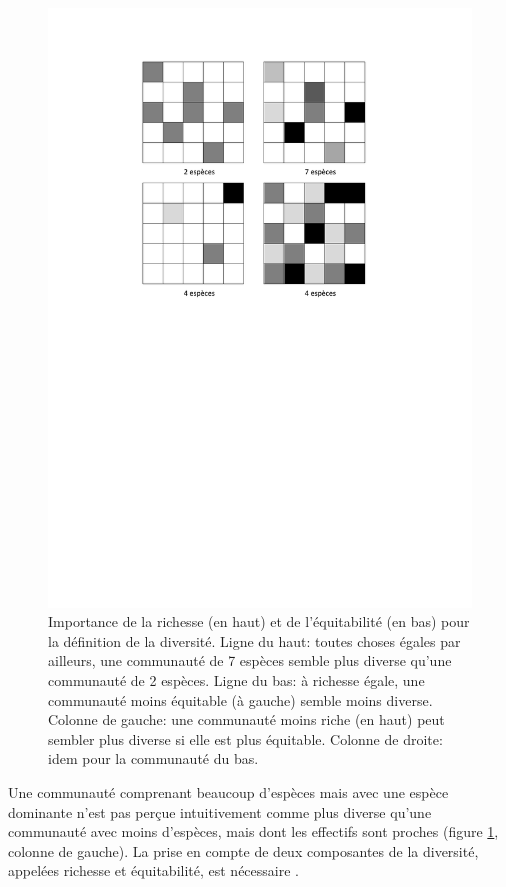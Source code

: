 \documentclass[
  11pt,
  american,
  a4paper,
  extrafontsizes,onecolumn,openright
  ]{memoir}
\begin{document}
\begin{figure}

{\centering \includegraphics[width=0.8\linewidth]{images/Composantes} 

}

\caption{Importance de la richesse (en haut) et de l'équitabilité (en bas) pour la définition de la diversité. Ligne du haut: toutes choses égales par ailleurs, une communauté de 7 espèces semble plus diverse qu'une communauté de 2 espèces. Ligne du bas: à richesse égale, une communauté moins équitable (à gauche) semble moins diverse. Colonne de gauche: une communauté moins riche (en haut) peut sembler plus diverse si elle est plus équitable. Colonne de droite: idem pour la communauté du bas.}\label{fig:Composantes}
\end{figure}

\normalsize

Une communauté comprenant beaucoup d'espèces mais avec une espèce dominante n'est pas perçue intuitivement comme plus diverse qu'une communauté avec moins d'espèces, mais dont les effectifs sont proches (figure \ref{fig:Composantes}, colonne de gauche).
La prise en compte de deux composantes de la diversité, appelées richesse et équitabilité, est nécessaire \autocite{Whittaker1965}.
\end{document}
